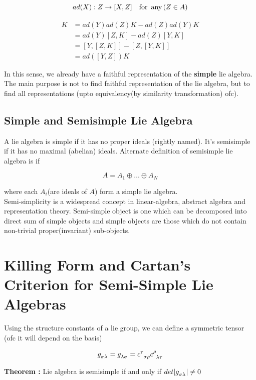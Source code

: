\documentclass{report}
\begin{document}
$$ad(X) : Z \rightarrow [X,Z] \quad \textrm{for\, any} \, (Z\in A)$$

\begin{align}
  [ad(Y),ad(Z)]K &= ad(Y)ad(Z)K - ad(Z)ad(Y)K\\
                 &= ad(Y)[Z,K] - ad(Z)[Y,K]\\
                 &= [Y,[Z,K]] - [Z,[Y,K]]\\
                 &= ad([Y,Z])K
\end{align}

\noindent In this sense, we already have a faithful representation of the \textbf{simple} lie algebra. The main purpose is not to find faithful representation of the lie algebra, but to find all representations (upto equivalency(by similarity transformation) ofc).

\subsection{Simple and Semisimple Lie Algebra}

\noindent A lie algebra is simple if it has no proper ideals (rightly named). It's semisimple if it has no maximal (abelian) ideals. Alternate definition of semisimple lie algebra is if

$$A = A_1 \oplus \dots \oplus A_N$$

\noindent where each $A_i$(are ideals of $A$) form a simple lie algebra.\\

\noindent Semi-simplicity is a widespread concept in linear-algebra, abstract algebra and representation theory. Semi-simple object is one which can be decomposed into direct sum of simple objects and simple objects are those which do not contain non-trivial proper(invariant) sub-objects.

\section{Killing Form and Cartan's Criterion for Semi-Simple Lie Algebras}

\noindent Using the structure constants of a lie group, we can define a symmetric tensor (ofc it will depend on the basis)

$$g\indices{_ \sigma _\lambda} = g\indices{_\lambda _\sigma} = c\indices{^\tau _\sigma _ \rho}c\indices{^\rho_\lambda_\tau}$$

\noindent\textbf{Theorem :} Lie algebra is semisimple if and only if $det|g\indices{_\sigma_\lambda}| \neq 0$
\end{document}
